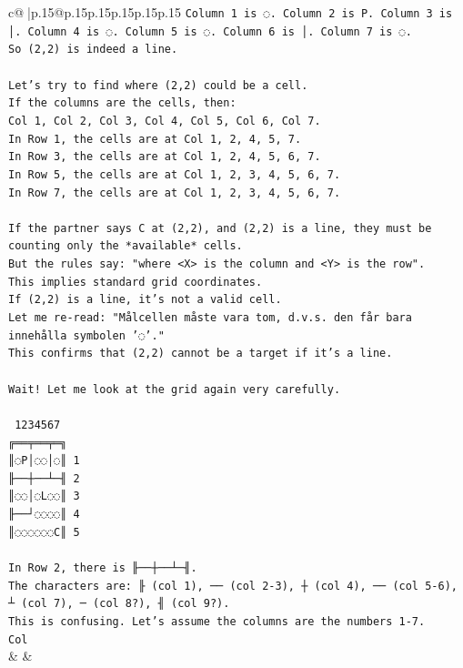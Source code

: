 \documentclass{article}
\begin{document}
{\begin{supertabular}{c@{$\;$}|p{.15\linewidth}@{}p{.15\linewidth}p{.15\linewidth}p{.15\linewidth}p{.15\linewidth}p{.15\linewidth}}
{{{\texttt{Column 1 is ◌. Column 2 is P. Column 3 is │. Column 4 is ◌. Column 5 is ◌. Column 6 is │. Column 7 is ◌.} \\
\texttt{So (2,2) is indeed a line.} \\
\\ 
\texttt{Let's try to find where (2,2) could be a cell.} \\
\texttt{If the columns are the cells, then:} \\
\texttt{Col 1, Col 2, Col 3, Col 4, Col 5, Col 6, Col 7.} \\
\texttt{In Row 1, the cells are at Col 1, 2, 4, 5, 7.} \\
\texttt{In Row 3, the cells are at Col 1, 2, 4, 5, 6, 7.} \\
\texttt{In Row 5, the cells are at Col 1, 2, 3, 4, 5, 6, 7.} \\
\texttt{In Row 7, the cells are at Col 1, 2, 3, 4, 5, 6, 7.} \\
\\ 
\texttt{If the partner says C at (2,2), and (2,2) is a line, they must be counting only the *available* cells.} \\
\texttt{But the rules say: "where <X> is the column and <Y> is the row".} \\
\texttt{This implies standard grid coordinates.} \\
\texttt{If (2,2) is a line, it's not a valid cell.} \\
\texttt{Let me re{-}read: "Målcellen måste vara tom, d.v.s. den får bara innehålla symbolen '◌'."} \\
\texttt{This confirms that (2,2) cannot be a target if it's a line.} \\
\\ 
\texttt{Wait! Let me look at the grid again very carefully.} \\
\\ 
\texttt{ 1234567} \\
\texttt{╔══╤══╤═╗} \\
\texttt{║◌P│◌◌│◌║ 1} \\
\texttt{╟──┼──┴─╢ 2} \\
\texttt{║◌◌│◌L◌◌║ 3} \\
\texttt{╟──┘◌◌◌◌║ 4} \\
\texttt{║◌◌◌◌◌◌C║ 5} \\
\\ 
\texttt{In Row 2, there is ╟──┼──┴─╢.} \\
\texttt{The characters are: ╟ (col 1), ── (col 2{-}3), ┼ (col 4), ── (col 5{-}6), ┴ (col 7), ─ (col 8?), ╢ (col 9?).} \\
\texttt{This is confusing. Let's assume the columns are the numbers 1{-}7.} \\
\texttt{Col} \\
            }
        }
    }
    & & \\ \\


\end{supertabular}}
\end{document}
